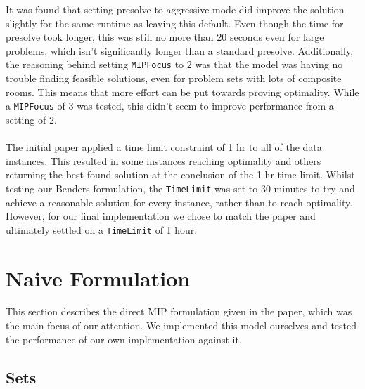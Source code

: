 \documentclass{article}
\begin{document}
\newpage
It was found that setting presolve to aggressive mode did improve the solution slightly for the same runtime as leaving this default. Even though the time for presolve took longer, this was still no more than 20 seconds even for large problems, which isn't significantly longer than a standard presolve. Additionally, the reasoning behind setting \texttt{MIPFocus} to $2$ was that the model was having no trouble finding feasible solutions, even for problem sets with lots of composite rooms. This means that more effort can be put towards proving optimality. While a \texttt{MIPFocus} of $3$ was tested, this didn't seem to improve performance from a setting of $2$.\\
\\
The initial paper applied a time limit constraint of 1 hr to all of the data instances. This resulted in some instances reaching optimality and others returning the best found solution at the conclusion of the 1 hr time limit. Whilst testing our Benders formulation, the \texttt{TimeLimit} was set to 30 minutes to try and achieve a reasonable solution for every instance, rather than to reach optimality. However, for our final implementation we chose to match the paper and ultimately settled on a \texttt{TimeLimit} of 1 hour.

\newpage

\section{Naive Formulation}
This section describes the direct MIP formulation given in the paper, which was the main
focus of our attention. We implemented this model ourselves and tested the performance of
our own implementation against it.
\subsection{Sets}
\end{document}

